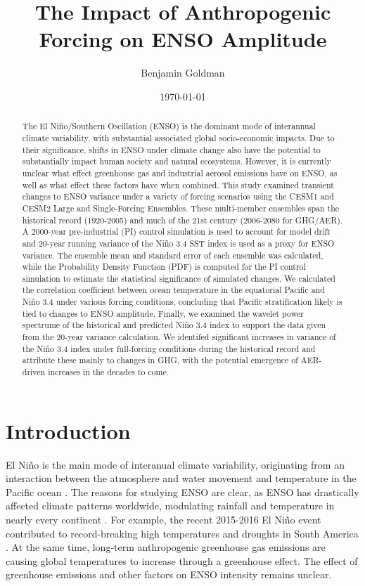 \documentclass[11pt]{article}
\author{Benjamin Goldman}
\date{\today}
\title{The Impact of Anthropogenic Forcing on ENSO Amplitude}
\begin{document}
\maketitle

\begin{abstract}
The El Niño/Southern Oscillation (ENSO) is the dominant mode of interannual climate variability, with substantial associated global socio-economic impacts. Due to their significance, shifts in ENSO under climate change also have the potential to substantially impact human society and natural ecosystems. However, it is currently unclear what effect greenhouse gas and industrial aerosol emissions have on ENSO, as well as what effect these factors have when combined. This study examined transient changes to ENSO variance under a variety of forcing scenarios using the CESM1 and CESM2 Large and Single-Forcing Ensembles. These multi-member ensembles span the historical record (1920-2005) and much of the 21st century (2006-2080 for GHG/AER). A 2000-year pre-industrial (PI) control simulation is used to account for model drift and 20-year running variance of the Niño 3.4 SST index is used as a proxy for ENSO variance. The ensemble mean and standard error of each ensemble was calculated, while the Probability Density Function (PDF) is computed for the PI control simulation to estimate the statistical significance of simulated changes. We calculated the correlation coefficient between ocean temperature in the equatorial Pacific and Niño 3.4 under various forcing conditions, concluding that Pacific stratification likely is tied to changes to ENSO amplitude. Finally, we examined the wavelet power spectrume of the historical and predicted Niño 3.4 index to support the data given from the 20-year variance calculation. We identifed significant increases in variance of the Niño 3.4 index under full-forcing conditions during the historical record and attribute these mainly to changes in GHG, with the potential emergence of AER-driven increases in the decades to come.
\end{abstract}

\section{Introduction}

El Niño is the main mode of interanual climate variability, originating from an interaction between the atmosphere and water movement and temperature in the Pacific ocean \citep{bjerknes1969atmospheric}. The reasons for studying ENSO are clear, as ENSO has drastically affected climate patterns worldwide, modulating rainfall and temperature in nearly every continent \citep{ropelewski1987global}. For example, the recent 2015-2016 El Niño event contributed to record-breaking high temperatures and droughts in South America \citep{jimenez2016record}. At the same time, long-term anthropogenic greenhouse gas emissions are causing global temperatures to increase through a greenhouse effect. The effect of greenhouse emissions and other factors on ENSO intensity remains unclear.
\end{document}

